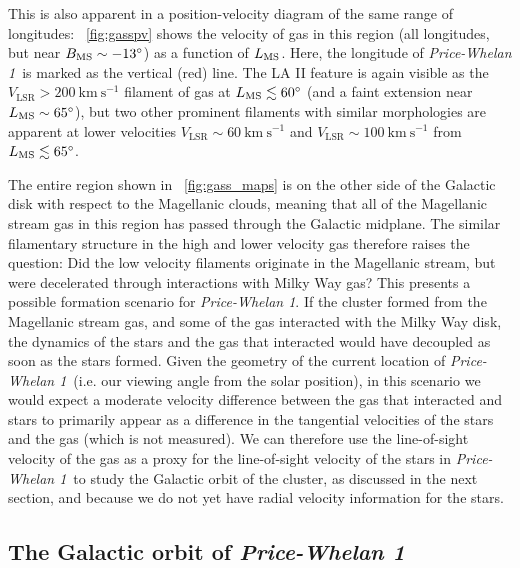 \documentclass[twocolumn]{aastex62}
\newcommand{\kms}{\ensuremath{\textrm{km}~\textrm{s}^{-1}}}
\newcommand{\clustername}{\textsl{Price-Whelan 1}}
\begin{document}
This is also apparent in a position-velocity diagram of the same range of longitudes:
\figurename~\ref{fig:gasspv} shows the velocity of gas in this region (all longitudes, but near $B_{\rm MS} \sim -13^\circ$) as a function of $L_{\rm MS}$.
Here, the longitude of \clustername\ is marked as the vertical (red) line.
The LA II feature is again visible as the $V_{\textrm{LSR}} > 200~\kms$ filament of gas at $L_{\rm MS} \lesssim 60^\circ$ (and a faint extension near $L_{\rm MS} \sim 65^\circ$), but two other prominent filaments with similar morphologies are apparent at lower velocities $V_{\textrm{LSR}} \sim 60~\kms$ and $V_{\textrm{LSR}} \sim 100~\kms$ from $L_{\rm MS} \lesssim 65^\circ$.

The entire region shown in \figurename~\ref{fig:gass_maps} is on the other side of the Galactic disk with respect to the Magellanic clouds, meaning that all of the Magellanic stream gas in this region has passed through the Galactic midplane.
The similar filamentary structure in the high and lower velocity gas therefore raises the question: Did the low velocity filaments originate in the Magellanic stream, but were decelerated through interactions with Milky Way gas?
This presents a possible formation scenario for \clustername.
If the cluster formed from the Magellanic stream gas, and some of the gas interacted with the Milky Way disk, the dynamics of the stars and the gas that interacted would have decoupled as soon as the stars formed.
Given the geometry of the current location of \clustername\ (i.e. our viewing angle from the solar position), in this scenario we would expect a moderate velocity difference between the gas that interacted and stars to primarily appear as a difference in the tangential velocities of the stars and the gas (which is not measured).
We can therefore use the line-of-sight velocity of the gas as a proxy for the line-of-sight velocity of the stars in \clustername\ to study the Galactic orbit of the cluster, as discussed in the next section, and because we do not yet have radial velocity information for the stars.


\subsection{The Galactic orbit of \clustername}
\label{sec:orbit}
\end{document}
